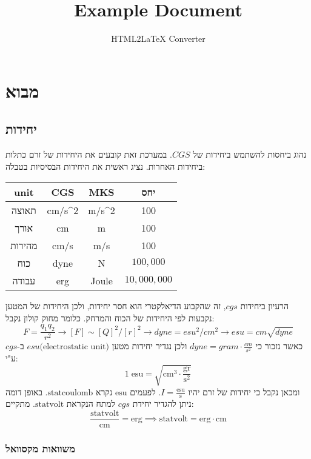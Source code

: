 \documentclass{tstextbook}
\begin{document}
\title{Example Document}
\author{HTML2LaTeX Converter}
\maketitle

\section{מבוא}

\subsection{יחידות}

נהוג ביחסות להשתמש ביחידות של \(CGS\). במערכת זאת קובעים את היחידות של זרם כתלות ביחידות האחרות. נציג ראשית את היחידות הבסיסיות בטבלה:

\begin{table}[htbp]
  \centering
  \begin{tabular}{|cccc|}
    \hline
    unit & CGS & MKS & יחס \\ \hline
    תאוצה & cm/s^2 & m/s^2 & 100 \\ \hline
    אורך & cm & m & 100 \\ \hline
    מהירות & cm/s & m/s & 100 \\ \hline
    כוח & dyne & N & \(100,000\) \\ \hline
    עבודה & erg & Joule & \(10,000,000\) \\ \hline
  \end{tabular}
\end{table}
הרעיון ביחידות \(cgs\), זה שהקבוע הדיאלקטרי הוא חסר יחידות, ולכן היחידות של המטען נקבעות לפי היחידות של הכוח והמרחק. כלומר מחוק קולון נקבל:
$$F={\frac{q_{1}q_{2}}{r^{2}}}\rightarrow[F]\sim[Q]^{2}/[r]^{2}\rightarrow d y n e=e s u^{2}/c m^{2}\rightarrow e s u=c m\sqrt{d y n e}$$
כאשר נזכור כי \(dyne=gram\cdot \frac{cm}{s^2}\) ולכן נגדיר יחידות מטען \(esu\text{(electrostatic unit)}\) ב-\(cgs\) ע"י:
$$1\;\mathrm{esu}=\sqrt{ \mathrm{cm}^3\cdot \mathrm{\frac{gr}{s^2}} }$$
ומכאן נקבל כי יחידות של זרם יהיו \(I=\mathrm{\frac{esu}{s}}\). לפעמים \(\mathrm{esu}\) נקרא \(\mathrm{statcoulomb}\).
באופן דומה ניתן להגדיר יחידת \(cgs\) למתח הנקראת \(\mathrm{statvolt}\). מתקיים:
$$\frac{\mathrm{statvolt}}{\mathrm{cm}}=\mathrm{erg}\implies \mathrm{statvolt=erg\cdot cm}$$

\subsubsection{משוואות מקסוואל}
\end{document}
